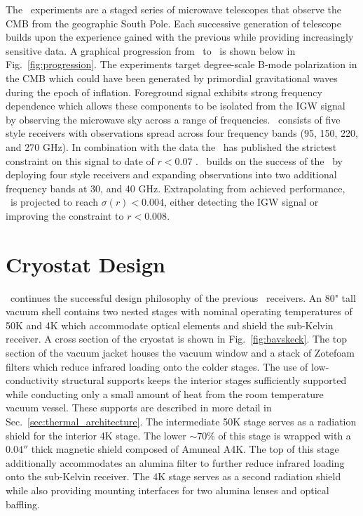 \documentclass[]{spie}  %
\begin{document}
The \bk\ experiments are a staged series of microwave telescopes that observe
the CMB from the geographic South Pole. Each successive generation of
telescope builds upon the experience gained with the previous while providing
increasingly sensitive data. A graphical progression from \ to
\biceparray\ is shown below in Fig.~\ref{fig:progression}. The experiments target degree-scale B-mode
polarization in the CMB which could have been generated by primordial
gravitational waves during the epoch of inflation. Foreground signal exhibits strong frequency dependence which allows these components to be isolated from the IGW
signal by observing the microwave sky across a range of frequencies.
\keckarray\ consists of five  style receivers with observations spread
across four frequency bands (95, 150, 220, and 270 GHz). In combination with the  data the \keckarray\ has
published the strictest constraint on this signal to date of $r<0.07$
\cite{bk14}. \biceparray\ builds on the success of the \keckarray\ by
deploying four  style receivers and expanding observations into two
additional frequency bands at 30, and 40 GHz. Extrapolating from achieved performance,
\biceparray\ is projected to reach $\sigma(r)<0.004$, either detecting the IGW
signal or improving the constraint to $r<0.008$. 



	
\section{Cryostat Design}

\biceparray\ continues the successful design philosophy of
the previous \bk\ receivers. An 80" tall vacuum shell contains two nested
stages with nominal operating temperatures of 50K and 4K which accommodate
optical elements and shield the sub-Kelvin receiver. A cross section of
the cryostat is shown in Fig.~\ref{fig:bavskeck}. The top section of the
vacuum jacket houses the vacuum window and a stack of Zotefoam filters which reduce infrared loading
onto the colder stages. The use of low-conductivity structural supports keeps
the interior stages sufficiently supported while conducting only a small
amount of heat from the room temperature vacuum vessel. These supports are
described in more detail in Sec.~\ref{sec:thermal_architecture}. The
intermediate 50K stage serves as a radiation shield for the interior 4K stage.
The lower $\sim70\%$ of this stage is wrapped with a $0.04''$ thick magnetic
shield composed of Amuneal A4K. The top of this stage additionally
accommodates an alumina filter to further reduce infrared loading onto the
sub-Kelvin receiver. The 4K stage serves as a second radiation shield while
also providing mounting interfaces for two alumina lenses and optical
baffling.
\end{document}
